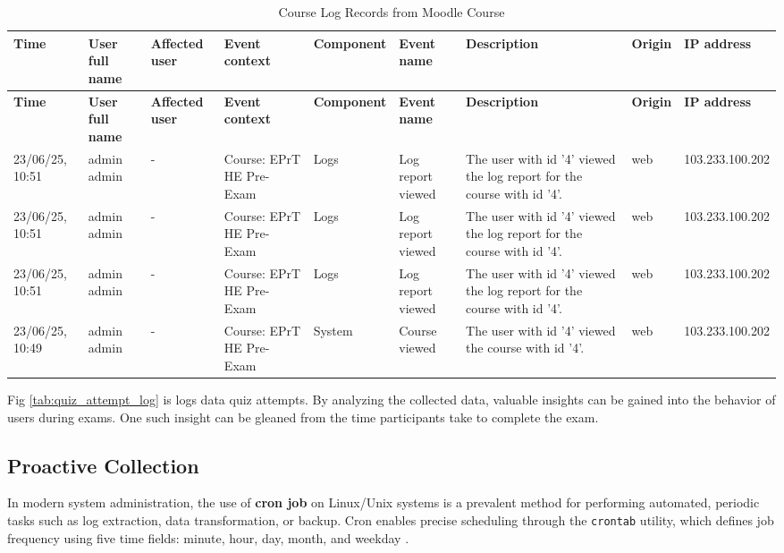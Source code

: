 \begin{landscape}
	\begin{longtable}{|p{1.4cm}|p{2cm}|p{1.3cm}|p{2.5cm}|p{1.8cm}|p{3cm}|p{4.2cm}|p{1.2cm}|p{2.5cm}|}
		\caption{Course Log Records from Moodle Course} \label{tab:course-log} \\
		\hline
		\textbf{Time} & \textbf{User full name} & \textbf{Affected user} & \textbf{Event context} & \textbf{Component} & \textbf{Event name} & \textbf{Description} & \textbf{Origin} & \textbf{IP address} \\
		\hline
		\endfirsthead
		
		\hline
		\textbf{Time} & \textbf{User full name} & \textbf{Affected user} & \textbf{Event context} & \textbf{Component} & \textbf{Event name} & \textbf{Description} & \textbf{Origin} & \textbf{IP address} \\
		\hline
		\endhead
		
		23/06/25, 10:51 & admin admin & - & Course: EPrT HE Pre-Exam & Logs & Log report viewed & The user with id '4' viewed the log report for the course with id '4'. & web & 103.233.100.202 \\
		\hline
		23/06/25, 10:51 & admin admin & - & Course: EPrT HE Pre-Exam & Logs & Log report viewed & The user with id '4' viewed the log report for the course with id '4'. & web & 103.233.100.202 \\
		\hline
		23/06/25, 10:51 & admin admin & - & Course: EPrT HE Pre-Exam & Logs & Log report viewed & The user with id '4' viewed the log report for the course with id '4'. & web & 103.233.100.202 \\
		\hline
		23/06/25, 10:49 & admin admin & - & Course: EPrT HE Pre-Exam & System & Course viewed & The user with id '4' viewed the course with id '4'. & web & 103.233.100.202 \\
		\hline
		
	\end{longtable}
\end{landscape}

Fig \ref{tab:quiz_attempt_log} is logs data quiz attempts. By analyzing the collected data, valuable insights can be gained into the behavior of users during exams. One such insight can be gleaned from the time participants take to complete the exam.
\subsection{Proactive Collection}
In modern system administration, the use of \textbf{cron job} on Linux/Unix systems is a prevalent method for performing automated, periodic tasks such as log extraction, data transformation, or backup. Cron enables precise scheduling through the \texttt{crontab} utility, which defines job frequency using five time fields: minute, hour, day, month, and weekday \citet{davidovic2015cron}.

